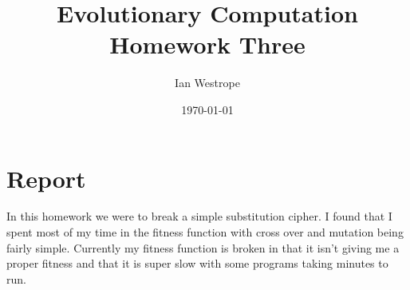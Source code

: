 \documentclass[12pt]{article}
\author{Ian Westrope}
\title{Evolutionary Computation Homework Three}
\date{\today}
\begin{document}
\maketitle

\section{Report}
In this homework we were to break a simple substitution cipher. I found that I spent most of my time in the fitness function with cross over and mutation being fairly simple. Currently my fitness function is broken in that it isn't giving me a proper fitness and that it is super slow with some programs taking minutes to run.
\end{document}
